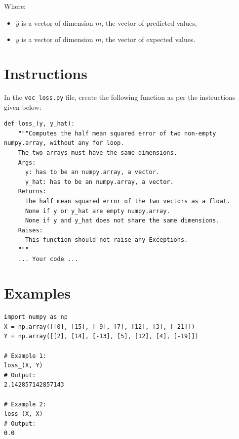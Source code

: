 \documentclass{42-en}
\begin{document}
Where:
\begin{itemize}
  \item $\hat{y}$ is a vector of dimension $m$, the vector of predicted values,
  \item $y$ is a vector of dimension $m$, the vector of expected values.
\end{itemize}

\newpage

\section*{Instructions}
In the \texttt{vec\_loss.py} file, create the following function as per the instructions given below:

\begin{verbatim}
def loss_(y, y_hat):
    """Computes the half mean squared error of two non-empty numpy.array, without any for loop.
    The two arrays must have the same dimensions.
    Args:
      y: has to be an numpy.array, a vector.
      y_hat: has to be an numpy.array, a vector.
    Returns:
      The half mean squared error of the two vectors as a float.
      None if y or y_hat are empty numpy.array.
      None if y and y_hat does not share the same dimensions.
    Raises:
      This function should not raise any Exceptions.
    """
    ... Your code ...
\end{verbatim}


\section*{Examples}
\begin{verbatim}
import numpy as np
X = np.array([[0], [15], [-9], [7], [12], [3], [-21]])
Y = np.array([[2], [14], [-13], [5], [12], [4], [-19]])

# Example 1:
loss_(X, Y)
# Output:
2.142857142857143

# Example 2:
loss_(X, X)
# Output:
0.0
\end{verbatim}


\newpage
\end{document}
